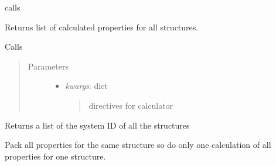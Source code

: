 \documentclass[letterpaper,10pt,english]{sphinxmanual}
\begin{document}
\begin{fulllineitems}
\begin{fulllineitems}
calls {\hyperref[classes:catcalc.CATCalc.get_calculator]{}}

\end{fulllineitems}


\begin{fulllineitems}
\label{classes:catcalc.CATCalc.get_property}
Returns list of calculated properties for all structures.

Calls {\hyperref[classes:catcalc.CATCalc.calculate]{}}
\begin{quote}\begin{description}
\item[{Parameters}] \leavevmode\begin{itemize}
\item {} 
\emph{kwargs}: dict
\begin{quote}

directives for calculator
\end{quote}

\end{itemize}

\end{description}\end{quote}

\end{fulllineitems}


\begin{fulllineitems}
\label{classes:catcalc.CATCalc.get_structures}
Returns a list of the system ID of all the structures

\end{fulllineitems}


\begin{fulllineitems}
\label{classes:catcalc.CATCalc.pack_atoms}
Pack all properties for the same structure so do only one calculation
of all properties for one structure.

\end{fulllineitems}



\end{fulllineitems}
\end{document}
